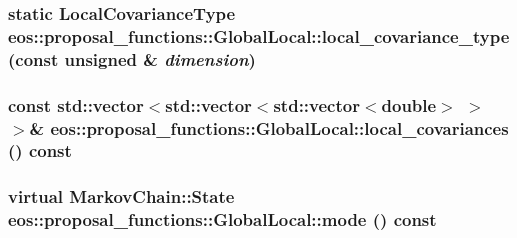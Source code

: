 \label{classeos_1_1proposal__functions_1_1GlobalLocal_a0dc6c82443a5a7f091aced9f00e9e924}
\hypertarget{classeos_1_1proposal__functions_1_1GlobalLocal_ab9e4e7b924b9cc58191abef0ec3ed007}{
\subsubsection[{local\_\-covariance\_\-type}]{\setlength{\rightskip}{0pt plus 5cm}static {\bf LocalCovarianceType} eos::proposal\_\-functions::GlobalLocal::local\_\-covariance\_\-type (const unsigned \& {\em dimension})}}
\label{classeos_1_1proposal__functions_1_1GlobalLocal_ab9e4e7b924b9cc58191abef0ec3ed007}
\hypertarget{classeos_1_1proposal__functions_1_1GlobalLocal_ad5c45a445627bed86c3d51b13b385956}{
\subsubsection[{local\_\-covariances}]{\setlength{\rightskip}{0pt plus 5cm}const std::vector$<$std::vector$<$std::vector$<$double$>$ $>$ $>$\& eos::proposal\_\-functions::GlobalLocal::local\_\-covariances () const}}
\label{classeos_1_1proposal__functions_1_1GlobalLocal_ad5c45a445627bed86c3d51b13b385956}
\hypertarget{classeos_1_1proposal__functions_1_1GlobalLocal_abf3e66748628edc462dd5f7b531f4c2b}{
\subsubsection[{mode}]{\setlength{\rightskip}{0pt plus 5cm}virtual {\bf MarkovChain::State} eos::proposal\_\-functions::GlobalLocal::mode () const}}
